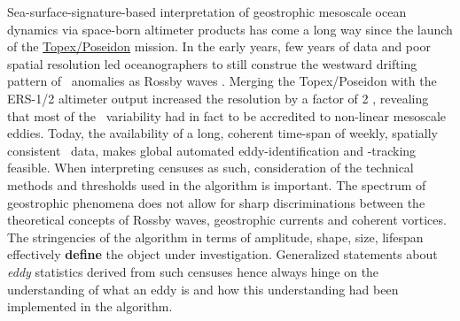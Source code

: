 \begin{minipage}{1.3\textwidth}
Sea-surface-signature-based interpretation of geostrophic mesoscale ocean dynamics via space-born altimeter products has come a long way since the launch of the \href{http://en.wikipedia.org/wiki/TOPEX/Poseidon}{Topex/Poseidon} mission. In the early years, few years of data and poor spatial resolution led oceanographers to still construe the westward drifting pattern of \SSH~anomalies as Rossby waves \citep{le1993sea,Killworth1997a}.
Merging the Topex/Poseidon with the ERS-1/2 altimeter output increased the resolution by a factor of 2 \citep{Chelton2007}, revealing that most of the \SSH~variability had in fact to be accredited to non-linear mesoscale eddies. Today, the availability of a long, coherent time-span of weekly, spatially consistent \SSH~data, makes global automated eddy-identification and -tracking feasible.
When interpreting censuses as such, consideration of the technical methods and thresholds used in the algorithm is important. The spectrum of geostrophic phenomena does not allow for sharp discriminations between the theoretical concepts of Rossby waves, geostrophic currents and coherent vortices.
The stringencies of the algorithm in terms of amplitude, shape, size, lifespan \etc effectively \textbf{define} the object under investigation. Generalized statements about \textit{eddy} statistics derived from such censuses hence always hinge on the understanding of what an eddy is and how this understanding had been implemented in the algorithm.


\end{minipage}
